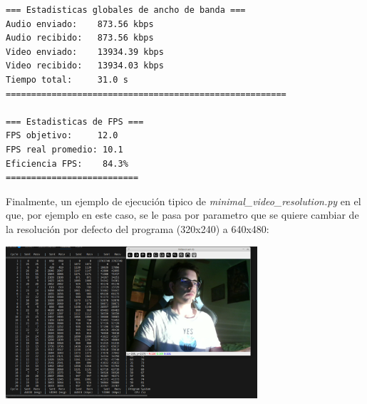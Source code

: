 \begin{adjustbox}{max width=\textwidth}
\begin{lstlisting}[language=bash,basicstyle=\ttfamily\scriptsize]
=== Estadisticas globales de ancho de banda ===
Audio enviado:    873.56 kbps
Audio recibido:   873.56 kbps
Video enviado:    13934.39 kbps
Video recibido:   13934.03 kbps
Tiempo total:     31.0 s
=======================================================

=== Estadisticas de FPS ===
FPS objetivo:     12.0
FPS real promedio: 10.1
Eficiencia FPS:    84.3%
==========================
\end{lstlisting}
\end{adjustbox}

\newpage

Finalmente, un ejemplo de ejecución tipico de \textit{minimal\_video\_resolution.py} en el que, por ejemplo en este caso, se le pasa por parametro que se quiere cambiar de la resolución por defecto del programa (320x240) a 640x480:
\begin{center}
	\includegraphics[width = 0.7\textwidth]{images/pruebas/ejecuion_normal_resolution.png}
	\label{fig:ejecucion_resolution}
\end{center}
\vspace{\baselineskip}

